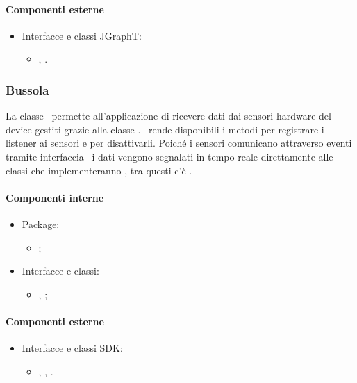 \documentclass[../Funzionalita.tex]{subfiles}
\begin{document}
			
			\paragraph*{Componenti esterne}
			
			\begin{itemize}
				\item Interfacce e classi JGraphT:
				\begin{itemize}
					\item[] \DijkstraShorterPath, \SimpleDirectedWeightedGraph.
				\end{itemize}
			\end{itemize}
		
		
		\subsubsection{Bussola}
			La classe \Compass\ permette all'applicazione di ricevere dati dai sensori hardware del device gestiti grazie alla classe \Sensor. \Compass\ rende disponibili i metodi per registrare i listener ai sensori e per disattivarli. Poiché i sensori comunicano attraverso eventi tramite interfaccia \SensorEventListener\ i dati vengono segnalati in tempo reale direttamente alle classi che implementeranno \CompassListener, tra questi c'è \NavigationActivity.
		
			\paragraph*{Componenti interne}
			\begin{itemize}
			
				\item Package:
				\begin{itemize}
					\item[] \compass;
				\end{itemize}
				
				\item Interfacce e classi:
				\begin{itemize}
					\item[] \Compass, \CompassListener;
				\end{itemize}
				
			\end{itemize}
			
			
			\paragraph*{Componenti esterne}
			\begin{itemize}
			
				\item Interfacce e classi SDK:
				\begin{itemize}
					\item[] \SensorManager, \Sensor, \SensorEventListener.
				\end{itemize}
				
			\end{itemize}
						
\end{document}
